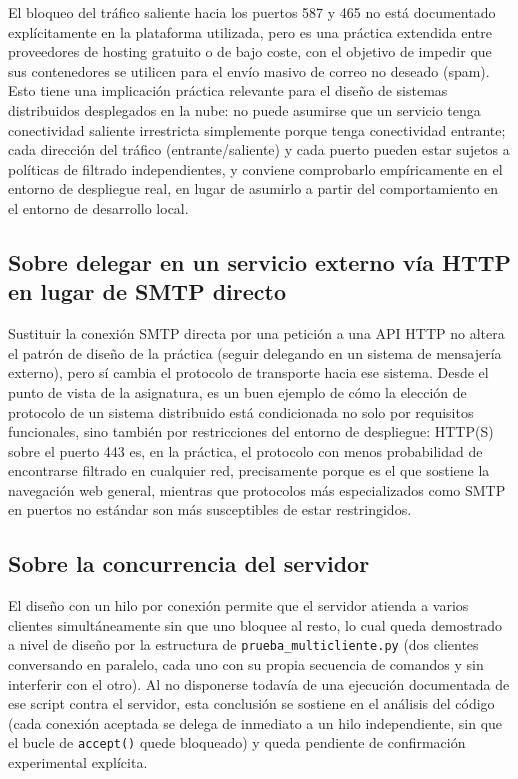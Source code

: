 \documentclass[12pt,a4paper]{article}
\begin{document}
El bloqueo del tráfico saliente hacia los puertos 587 y 465 no está documentado explícitamente en la plataforma utilizada, pero es una práctica extendida entre proveedores de hosting gratuito o de bajo coste, con el objetivo de impedir que sus contenedores se utilicen para el envío masivo de correo no deseado (spam). Esto tiene una implicación práctica relevante para el diseño de sistemas distribuidos desplegados en la nube: no puede asumirse que un servicio tenga conectividad saliente irrestricta simplemente porque tenga conectividad entrante; cada dirección del tráfico (entrante/saliente) y cada puerto pueden estar sujetos a políticas de filtrado independientes, y conviene comprobarlo empíricamente en el entorno de despliegue real, en lugar de asumirlo a partir del comportamiento en el entorno de desarrollo local.

\subsection{Sobre delegar en un servicio externo vía HTTP en lugar de SMTP directo}

Sustituir la conexión SMTP directa por una petición a una API HTTP no altera el patrón de diseño de la práctica (seguir delegando en un sistema de mensajería externo), pero sí cambia el protocolo de transporte hacia ese sistema. Desde el punto de vista de la asignatura, es un buen ejemplo de cómo la elección de protocolo de un sistema distribuido está condicionada no solo por requisitos funcionales, sino también por restricciones del entorno de despliegue: HTTP(S) sobre el puerto 443 es, en la práctica, el protocolo con menos probabilidad de encontrarse filtrado en cualquier red, precisamente porque es el que sostiene la navegación web general, mientras que protocolos más especializados como SMTP en puertos no estándar son más susceptibles de estar restringidos.

\subsection{Sobre la concurrencia del servidor}

El diseño con un hilo por conexión permite que el servidor atienda a varios clientes simultáneamente sin que uno bloquee al resto, lo cual queda demostrado a nivel de diseño por la estructura de \texttt{prueba\_multicliente.py} (dos clientes conversando en paralelo, cada uno con su propia secuencia de comandos y sin interferir con el otro). Al no disponerse todavía de una ejecución documentada de ese script contra el servidor, esta conclusión se sostiene en el análisis del código (cada conexión aceptada se delega de inmediato a un hilo independiente, sin que el bucle de \texttt{accept()} quede bloqueado) y queda pendiente de confirmación experimental explícita.
\end{document}

